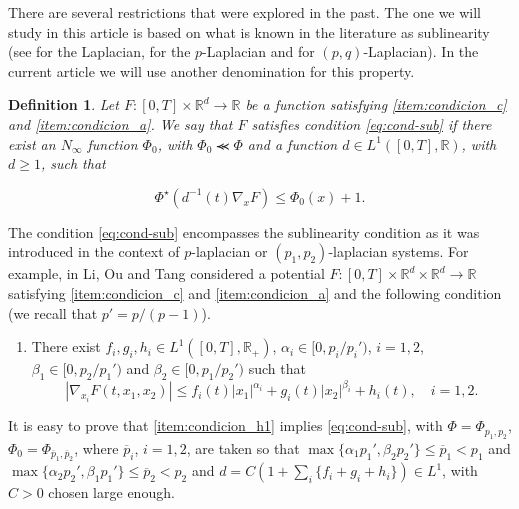 \documentclass[twoside]{article}
\makeatletter
\newtheorem{defi}[thm]{Definition}
\theoremstyle{remark}
\newcounter{example}[section]
\newcommand{\labitem}[2]{%
\def\@itemlabel{#1}
\item
\def\@currentlabel{#1}\label{#2}}
\newcommand{\rr}{\mathbb{R}}
\renewcommand{\leq}{\leqslant}
\renewcommand{\geq}{\geqslant}
\makeatother
\begin{document}
There are several restrictions that were explored in the past. The one we will study in this article is based on what is known in the literature as sublinearity (see \cite{tang1998periodic,wu1999periodic,zhao2004periodic} for the Laplacian, \cite{tang2010periodic,li2015infinitely} for the $p$-Laplacian and \cite{yang2013existence,li2014periodic,pasca2010periodic,pacsca2010some} for $(p,q)$-Laplacian). In the current article we will use another denomination for this property.




\begin{defi} Let $F:[0,T]\times \rr^d\to\rr$ be a function satisfying \ref{item:condicion_c} and \ref{item:condicion_a}. We say that $F$ satisfies condition \eqref{eq:cond-sub} if there exist an $N_{\infty}$ function $\Phi_0$, with $\Phi_0 \llcurly \Phi$ and
a function $d \in  L^1([0,T],\rr)$, with $d\geq 1$, such that

\begin{equation}\label{eq:cond-sub}
  \Phi^{\star}(d^{-1}(t)\nabla_x F)\leq \Phi_0(x)+1.\tag{$B$}
\end{equation}
\end{defi}


The condition \eqref{eq:cond-sub} encompasses the sublinearity condition as it was introduced in the context of $p$-laplacian or $(p_1,p_2)$-laplacian systems. For example, in
 \cite[Thm. 1.1.]{li2014periodic} Li, Ou and Tang considered a potential $F:[0,T]\times\rr^d\times\rr^d\to\rr$ satisfying \ref{item:condicion_c} and \ref {item:condicion_a} and the following condition  (we recall that $p'=p/(p-1)$).
\begin{enumerate}   
  \labitem{(H)}{item:condicion_h1} There exist $f_i,g_i,h_i\in L^1([0,T],\rr_+)$,  $\alpha_i\in [0,p_i/p_i')$, $i=1,2$,  $\beta_1\in [0,p_2/p_1')$ and $\beta_2\in [0,p_1/p_2')$ such that
 \begin{equation*}
    |\nabla_{x_i}F(t,x_1,x_2)|\leq f_i(t)|x_1|^{\alpha_i}+g_i(t)|x_2|^{\beta_i}+h_i(t),\quad i=1,2.
 \end{equation*}
\end{enumerate}
It is easy to prove that \ref{item:condicion_h1} implies \eqref{eq:cond-sub}, with $\Phi=\Phi_{p_1,p_2}$, 
$\Phi_0=\Phi_{\overline{p}_1,\overline{p}_2}$, where $\overline{p}_i$, $i=1,2$, are taken so that  $\max\{\alpha_1p_1',\beta_2p_2'\}\leq \overline{p}_1<p_1$ and $\max\{\alpha_2p_2',\beta_1p_1'\}\leq \overline{p}_2<p_2$ and  $d=C(1+\sum_i \{f_i+g_i+h_i\})\in L^1$, with  $C>0$ chosen large enough.
\end{document}
